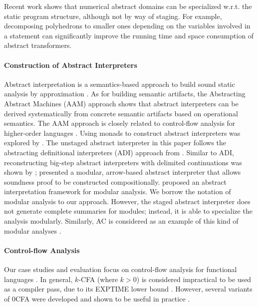 Recent work shows that numerical abstract domains can be
specialized w.r.t. the static program structure, although not by
way of staging. For example, decomposing polyhedrons
\cite{DBLP:conf/popl/SinghPV17, Singh:2017:PCD:3177123.3158143} to
smaller ones depending on the variables involved in a statement can
significantly improve the running time and space consumption of abstract
transformers.

\paragraph{Construction of Abstract Interpreters} Abstract interpretation is a
semantics-based approach to build sound static analysis by approximation
\cite{DBLP:conf/popl/CousotC77, Cousot98-5}.
As for building semantic artifacts, the Abstracting Abstract Machines (AAM)
\cite{DBLP:journals/jfp/HornM12, DBLP:conf/icfp/HornM10} approach shows that
abstract interpreters can be derived systematically from concrete semantic
artifacts based on operational semantics.
The AAM approach is closely related to control-flow analysis for higher-order languages
\cite{Midtgaard:2012:CAF:2187671.2187672, Shivers:1991:SSC:115865.115884}.
Using monads to construct abstract interpreters was explored by
\citet{Sergey:2013:MAI:2491956.2491979, DBLP:journals/pacmpl/DaraisLNH17,
Darais:2015:GTM:2814270.2814308}.
The unstaged abstract interpreter in this paper follows the abstracting
definitional interpreters (ADI) approach from
\citet{DBLP:journals/pacmpl/DaraisLNH17}.  Similar to ADI, reconstructing
big-step abstract interpreters with delimited continuations was shown by
\citet{Wei:2018:RAA:3243631.3236800}; \citet{Keidel:2018:CSP:3243631.3236767}
presented a modular, arrow-based abstract interpreter that allows soundness
proof to be constructed compositionally.
\citet{DBLP:conf/cc/CousotC02} proposed an abstract interpretation framework for
modular analysis. We borrow the notation of modular analysis to our approach.
However, the staged abstract interpreter does not generate complete summaries for
modules; instead, it is able to specialize the analysis modularly. Similarly, AC
is considered as an example of this kind of modular analyses \cite{DBLP:conf/cc/CousotC02}.

\paragraph{Control-flow Analysis} Our case studies and evaluation focus on
control-flow analysis for functional languages
\cite{Shivers:1991:SSC:115865.115884, Midtgaard:2012:CAF:2187671.2187672}. In
general, $k$-CFA (where $k > 0$) is considered impractical to be used as a
compiler pass, due to its EXPTIME lower bound
\cite{VanHorn:2008:DKC:1411204.1411243}.  However, several variants of 0CFA
were developed and shown to be useful in practice
\cite{Adams:2011:FTR:2048066.2048105, Bergstrom:2014:PEH:2628136.2628153,
ashley:practical, Reppy:2006:TCA:1159876.1159888}.

